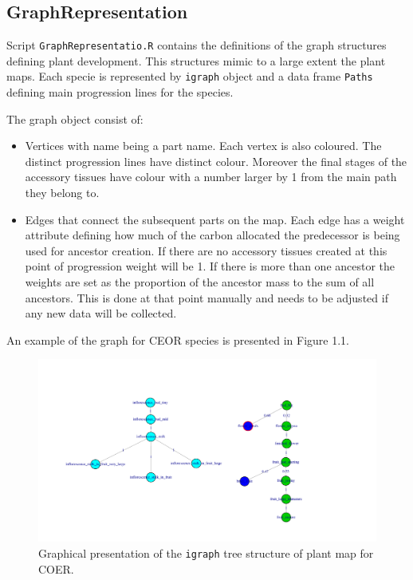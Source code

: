 \documentclass[10pt]{book} %
\begin{document}
\subsection{GraphRepresentation}

Script \texttt{GraphRepresentatio.R} contains the definitions of the graph structures defining plant development. This structures mimic to a large extent the plant maps.
Each specie is represented by \texttt{igraph} object and a data frame \texttt{Paths} defining main progression lines for the species.

The graph object consist of:
\begin{itemize}
\item Vertices with name being a part name. Each vertex is also coloured. The distinct progression lines have distinct colour. Moreover the final stages of the accessory tissues have colour with a number larger by 1 from the main path they belong to.
\item Edges that connect the subsequent parts on the map. Each edge has a weight attribute defining how much of the carbon allocated the predecessor is being used for ancestor creation. If there are no accessory tissues created at this point of progression weight will be 1. If there is more than one ancestor the weights are set as the proportion of the ancestor mass to the sum of all ancestors. This is done at that point manually and needs to be adjusted if any new data will be collected.
\end{itemize}
An example of the graph for CEOR species is presented in Figure 1.1.


\begin{figure}[htb]
\begin{center}
\includegraphics[width=6in]{images/PlantGraph.pdf}
\end{center}
\caption{Graphical presentation of the \texttt{igraph} tree structure of plant map for COER.}
\end{figure}
\end{document}
